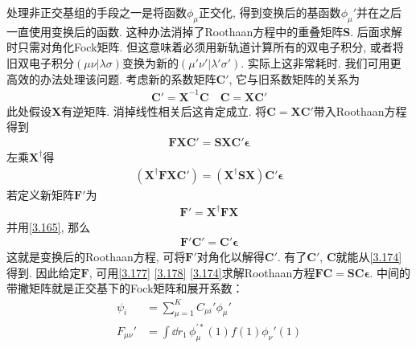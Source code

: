 处理非正交基组的手段之一是将函数${\phi_\mu}$正交化, 
得到变换后的基函数$\phi_\mu'$并在之后一直使用变换后的函数. 
这种办法消掉了Roothaan方程中的重叠矩阵$\mathbf{S}$. 
后面求解时只需对角化Fock矩阵. 
但这意味着必须用新轨道计算所有的双电子积分, 
或者将旧双电子积分$(\mu\nu|\lambda\sigma)$变换为新的$(\mu'\nu'|\lambda'\sigma')$. 
实际上这非常耗时. 
我们可用更高效的办法处理该问题. 
考虑新的系数矩阵$\mathbf{C}'$, 
它与旧系数矩阵的关系为
\begin{align}
	\label{3.174}
	\mathbf{C'=X}^{-1}\mathbf{C}\quad \mathbf{C=XC'}
\end{align}
此处假设$\mathbf{X}$有逆矩阵. 
消掉线性相关后这肯定成立. 
将$\mathbf{C=XC'}$带入Roothaan方程得到
\begin{align}
	\mathbf{FXC'=SXC'}\bm{\epsilon}
\end{align} 
左乘$\mathbf{X^\dagger}$得
\begin{align}
	(\mathbf{X^\dagger FX}\mathbf{C'}) = (\mathbf{X^\dagger SX})\mathbf{C'}\bm{\epsilon}
\end{align}
若定义新矩阵$\mathbf{F}'$为
\begin{align}
	\label{3.177}
	\mathbf{F'=X^\dagger FX}
\end{align}
并用\autoref{3.165}, 
那么
\begin{align}
	\label{3.178}
	\mathbf{F'C'=C'}\bm{\epsilon}
\end{align}
这就是变换后的Roothaan方程, 
可将$\mathbf{F'}$对角化以解得$\mathbf{C'}$. 
有了$\mathbf{C'}$, 
$\mathbf{C}$就能从\autoref{3.174}得到. 
因此给定$\mathbf{F}$, 
可用\autoref{3.177} \autoref{3.178} \autoref{3.174}求解Roothaan方程$\mathbf{FC=SC}\bm{\epsilon}$. 
中间的带撇矩阵就是正交基下的Fock矩阵和展开系数：
\begin{align}
	\label{3.179}
	\psi_i & = \sum_{\mu=1}^{K}C_{\mu i}'\phi_\mu'\\
	\label{3.180}
	F_{\mu\nu}' & = \int\dd{r}_1\,\phi^{\prime*}_\mu(1)f(1)\phi_\nu'(1)
\end{align}

